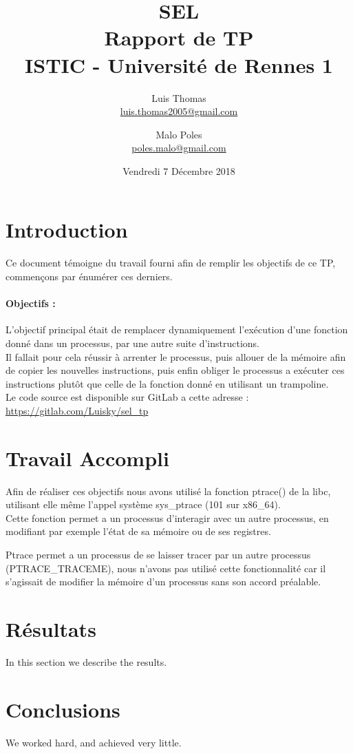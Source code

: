 \documentclass[12pt]{article}
\author{
        Luis Thomas\\
        \href{mailto:luis.thomas2005@gmail.com}{luis.thomas2005@gmail.com}\\
            \and
        Malo Poles\\
        \href{mailto:poles.malo@gmail.com }{poles.malo@gmail.com }\\
}
\title{SEL\\Rapport de TP\\ISTIC - Université de Rennes 1\\}
\date{Vendredi 7 Décembre 2018}
\begin{document}
\maketitle

\newpage

\section{Introduction}

Ce document témoigne du travail fourni afin de remplir les objectifs de ce TP, commençons par énumérer ces derniers.

\paragraph{Objectifs :}

L'objectif principal était de remplacer dynamiquement l’exécution d'une fonction donné dans un processus, par une autre suite d'instructions.\\
Il fallait pour cela réussir à arrenter le processus, puis allouer de la mémoire afin de copier les nouvelles instructions, 
puis enfin obliger le processus a exécuter ces instructions plutôt que celle de la fonction donné en utilisant un trampoline.\\

Le code source est disponible sur GitLab a cette adresse : \url{https://gitlab.com/Luisky/sel_tp}


\section{Travail Accompli}

Afin de réaliser ces objectifs nous avons utilisé la fonction ptrace() de la libc, utilisant elle même l'appel système sys\_ptrace (101 sur x86\_64).\\

Cette fonction permet a un processus d'interagir avec un autre processus, en modifiant par exemple l'état de sa mémoire ou de ses registres.

Ptrace permet a un processus de se laisser tracer par un autre processus (PTRACE\_TRACEME), nous n'avons pas utilisé cette fonctionnalité car il
s'agissait de modifier la mémoire d'un processus sans son accord préalable.

\section{Résultats}
In this section we describe the results.

\section{Conclusions}
We worked hard, and achieved very little.
\end{document}

